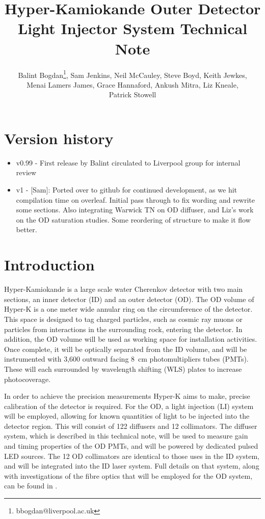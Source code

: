 \documentclass[a4paper,11pt]{article}
\begin{document}
\title{Hyper-Kamiokande Outer Detector Light Injector System Technical Note}
\author{Balint Bogdan\footnote{bbogdan@liverpool.ac.uk}, Sam Jenkins, Neil McCauley, Steve Boyd, Keith Jewkes,\\Menai Lamers James, Grace Hannaford, Ankush Mitra, Liz Kneale,
\\Patrick Stowell}

\maketitle

\tableofcontents

\newpage

\section{Version history}
\begin{itemize}
\item v0.99 - First release by Balint circulated to Liverpool group for internal review
\item v1 - [Sam]: Ported over to github for continued development, as we hit compilation time on overleaf. Initial pass through to fix wording and rewrite some sections. Also integrating Warwick TN on OD diffuser, and Liz's work on the OD saturation studies. Some reordering of structure to make it flow better.
\end{itemize}

\newpage

\section{Introduction}
\label{sec:intro}

Hyper-Kamiokande is a large scale water Cherenkov detector with two main sections, an inner detector (ID) and an outer detector (OD). The OD volume of Hyper-K is a one meter wide annular ring on the circumference of the detector. This space is designed to tag charged particles, such as cosmic ray muons or particles from interactions in the surrounding rock, entering the detector. In addition, the OD volume will be used as working space for installation activities. Once complete, it will be optically separated from the ID volume, and will be instrumented with 3,600 outward facing 8~cm photomultipliers tubes (PMTs). These will each surrounded by wavelength shifting (WLS) plates to increase photocoverage.

In order to achieve the precision measurements Hyper-K aims to make, precise calibration of the detector is required. For the OD, a light injection (LI) system will be employed, allowing for known quantities of light to be injected into the detector region. This will consist of 122 diffusers and 12 collimators. The diffuser system, which is described in this technical note, will be used to measure gain and timing properties of the OD PMTs, and will be powered by dedicated pulsed LED sources. The 12 OD collimators are identical to those uses in the ID system, and will be integrated into the ID laser system. Full details on that system, along with investigations of the fibre optics that will be employed for the OD system, can be found in \cite{TN91}.
\end{document}
